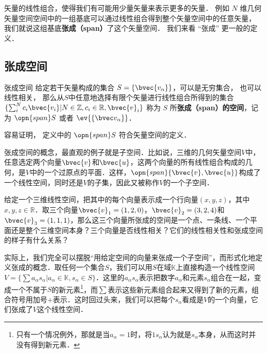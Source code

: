 

矢量的线性组合，使得我们有可能用少量矢量来表示更多的矢量． 例如 $N$ 维几何矢量空间空间中的一组基底可以通过线性组合得到整个矢量空间中的任意矢量， 我们就说这组基底\textbf{张成（span）}了这个矢量空间． 我们来看 “张成” 更一般的定义．

\subsection{张成空间}

\begin{definition}{张成空间}
给定若干矢量构成的集合 $S=\{\bvec{v_\alpha}\}$，可以是无穷集合， 也可以线性相关， 那么从$S$中任意地选择有限个矢量进行线性组合所得到的集合 $\{\sum_i^N c_i\bvec{v_i}|N\in\mathbb{Z}, c_i\in\mathbb{R}, \bvec{v}_i\}$ 称为 $S$ 所\textbf{张成（span）的空间}，记为 $\opn{span} S$ 或者 $\ev{\{\bvec v_\alpha\}}$．
\end{definition}
容易证明， 定义中的 $\opn{span} S$ 符合矢量空间的定义．

张成空间的概念，最直观的例子就是子空间．比如说，三维的几何矢量空间$V$中，任意选定两个向量$\bvec{v}$和$\bvec{u}$，这两个向量的所有线性组合构成的几何，是$V$中的一个过原点的平面．这样，$\opn{span}\{\bvec{v}, \bvec{u}\}$构成了一个线性空间，同时还是$V$的子集，因此又被称作$V$的一个子空间．

\begin{exercise}{}\label{VecSpn_exe1}
给定一个三维线性空间，把其中的每个向量表示成一个行向量$(x,y,z)$，其中$x,y,z\in\mathbb{R}$．取三个向量$\bvec{v}_1=(1,2,0)$，$\bvec{v}_2=(3,2,4)$和$\bvec{v}_3=(1,1,1)$，那么这三个向量所张成的空间是一个点、一条线、一个平面还是整个三维空间本身？三个向量是否线性相关？它们的线性相关性和张成空间的样子有什么关系？
\end{exercise}

实际上，我们完全可以摆脱“用给定空间的向量来张成一个子空间”，而形式化地定义张成的概念．取任何一个集合$S$，我们可以用$S$在域$\mathbb{K}$上直接构造一个线性空间$V=\{\sum a_\alpha s_\alpha|a_\alpha\in\mathbb{K}, s_\alpha\in S\}$．这里的$a_\alpha s_\alpha$表示把数字$a_\alpha$和元素$s_\alpha$组合在一起，变成一个不属于$S$的新元素\footnote{只有一个情况例外，那就是当$a_\alpha=1$时，将$1s_\alpha$认为就是$s_\alpha$本身，从而这时并没有得到新元素．}，而$\sum$表示这些新元素组合起来又得到了新的元素，组合符号用加号$+$表示．这时回过头来，我们可以把每个$s_\alpha$看成是$V$的一个向量，它们张成了$V$这个线性空间．

